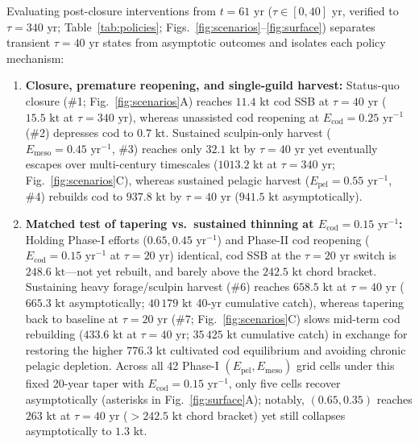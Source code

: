 \documentclass[11pt,letterpaper]{article}
\begin{document}
Evaluating post-closure interventions from $t = 61\text{ yr}$ ($\tau \in [0, 40]\text{ yr}$, verified to $\tau = 340\text{ yr}$; Table~\ref{tab:policies}; Figs.~\ref{fig:scenarios}--\ref{fig:surface}) separates transient $\tau = 40\text{ yr}$ states from asymptotic outcomes and isolates each policy mechanism:
\begin{enumerate}
  \item \textbf{Closure, premature reopening, and single-guild harvest:} Status-quo closure (\#1; Fig.~\ref{fig:scenarios}A) reaches $11.4\text{ kt}$ cod SSB at $\tau = 40\text{ yr}$ ($15.5\text{ kt}$ at $\tau = 340\text{ yr}$), whereas unassisted cod reopening at $E_{\mathrm{cod}} = 0.25\text{ yr}^{-1}$ (\#2) depresses cod to $0.7\text{ kt}$. Sustained sculpin-only harvest ($E_{\mathrm{meso}} = 0.45\text{ yr}^{-1}$, \#3) reaches only $32.1\text{ kt}$ by $\tau = 40\text{ yr}$ yet eventually escapes over multi-century timescales ($1013.2\text{ kt}$ at $\tau = 340\text{ yr}$; Fig.~\ref{fig:scenarios}C), whereas sustained pelagic harvest ($E_{\mathrm{pel}} = 0.55\text{ yr}^{-1}$, \#4) rebuilds cod to $937.8\text{ kt}$ by $\tau = 40\text{ yr}$ ($941.5\text{ kt}$ asymptotically).
  \item \textbf{Matched test of tapering vs.\ sustained thinning at $E_{\mathrm{cod}} = 0.15\text{ yr}^{-1}$:} Holding Phase-I efforts ($0.65, 0.45\text{ yr}^{-1}$) and Phase-II cod reopening ($E_{\mathrm{cod}} = 0.15\text{ yr}^{-1}$ at $\tau = 20\text{ yr}$) identical, cod SSB at the $\tau = 20\text{ yr}$ switch is $248.6\text{ kt}$---not yet rebuilt, and barely above the $242.5\text{ kt}$ chord bracket. Sustaining heavy forage/sculpin harvest (\#6) reaches $658.5\text{ kt}$ at $\tau = 40\text{ yr}$ ($665.3\text{ kt}$ asymptotically; $40\,179\text{ kt}$ 40-yr cumulative catch), whereas tapering back to baseline at $\tau = 20\text{ yr}$ (\#7; Fig.~\ref{fig:scenarios}C) slows mid-term cod rebuilding ($433.6\text{ kt}$ at $\tau = 40\text{ yr}$; $35\,425\text{ kt}$ cumulative catch) in exchange for restoring the higher $776.3\text{ kt}$ cultivated cod equilibrium and avoiding chronic pelagic depletion. Across all 42 Phase-I $(E_{\mathrm{pel}}, E_{\mathrm{meso}})$ grid cells under this fixed 20-year taper with $E_{\mathrm{cod}} = 0.15\text{ yr}^{-1}$, only five cells recover asymptotically (asterisks in Fig.~\ref{fig:surface}A); notably, $(0.65, 0.35)$ reaches $263\text{ kt}$ at $\tau = 40\text{ yr}$ ($> 242.5\text{ kt}$ chord bracket) yet still collapses asymptotically to $1.3\text{ kt}$.

\end{enumerate}
\end{document}
